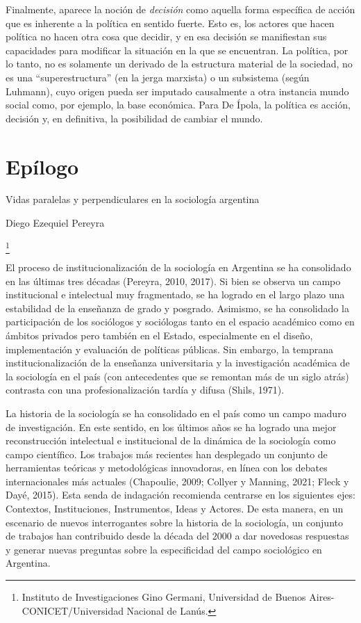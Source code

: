 Finalmente, aparece la noción de \emph{decisión} como aquella forma específica de acción que es inherente a la política en sentido fuerte. Esto es, los actores que hacen política no hacen otra cosa que decidir, y en esa decisión se manifiestan sus capacidades para modificar la situación en la que se encuentran. La política, por lo tanto, no es solamente un derivado de la estructura material de la sociedad, no es una ``superestructura'' (en la jerga marxista) o un subsistema (según Luhmann), cuyo origen pueda ser imputado causalmente a otra instancia mundo social como, por ejemplo, la base económica. Para De Ípola, la política es acción, decisión y, en definitiva, la posibilidad de cambiar el mundo.

\backmatter

\chapter{Epílogo}

Vidas paralelas y perpendiculares en la sociología argentina

Diego Ezequiel Pereyra

\footnote{Instituto de Investigaciones Gino Germani, Universidad de Buenos Aires-CONICET/Universidad Nacional de Lanús.}

El proceso de institucionalización de la sociología en Argentina se ha consolidado en las últimas tres décadas (Pereyra, 2010, 2017). Si bien se observa un campo institucional e intelectual muy fragmentado, se ha logrado en el largo plazo una estabilidad de la enseñanza de grado y posgrado. Asimismo, se ha consolidado la participación de los sociólogos y sociólogas tanto en el espacio académico como en ámbitos privados pero también en el Estado, especialmente en el diseño, implementación y evaluación de políticas públicas. Sin embargo, la temprana institucionalización de la enseñanza universitaria y la investigación académica de la sociología en el país (con antecedentes que se remontan más de un siglo atrás) contrasta con una profesionalización tardía y difusa (Shils, 1971).

La historia de la sociología se ha consolidado en el país como un campo maduro de investigación. En este sentido, en los últimos años se ha logrado una mejor reconstrucción intelectual e institucional de la dinámica de la sociología como campo científico. Los trabajos más recientes han desplegado un conjunto de herramientas teóricas y metodológicas innovadoras, en línea con los debates internacionales más actuales (Chapoulie, 2009; Collyer y Manning, 2021; Fleck y Dayé, 2015). Esta senda de indagación recomienda centrarse en los siguientes ejes: Contextos, Instituciones, Instrumentos, Ideas y Actores. De esta manera, en un escenario de nuevos interrogantes sobre la historia de la sociología, un conjunto de trabajos han contribuido desde la década del 2000 a dar novedosas respuestas y generar nuevas preguntas sobre la especificidad del campo sociológico en Argentina.

